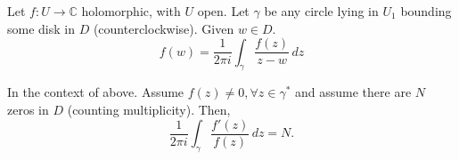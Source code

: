 \begin{thm}
	Let $f: U \to \mathbb{C}$ holomorphic, with $U$ open. Let $\gamma$ be any circle lying in $U_1$ bounding some disk in $D$ (counterclockwise). Given $w \in D$. \[
		f(w) = \frac{1}{2\pi i}\int_\gamma \frac{f(z)}{z-w} \,dz
	\]
\end{thm}

\begin{thm}
	In the context of above. Assume $f(z) \neq 0, \forall z \in \gamma^*$ and assume there are $N$ zeros in $D$ (counting multiplicity). Then, \[
		\frac{1}{2 \pi i} \int_\gamma \frac{f'(z)}{f(z)} \,dz = N.
	\]
\end{thm}
